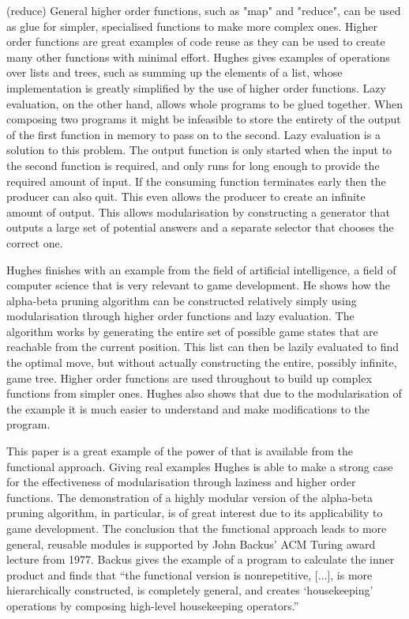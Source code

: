 \functions(reduce)
General higher order functions, such as "map" and "reduce", can be used as glue for
simpler, specialised functions to make more complex ones. Higher order functions
are great examples of code reuse as they can be used to create many other functions
with minimal effort. Hughes gives examples of operations over lists and trees, such
as summing up the elements of a list, whose implementation is greatly simplified
by the use of higher order functions. Lazy evaluation, on the other hand, allows
whole programs to be glued together. When composing two programs it might be
infeasible to store the entirety of the output of the first function in memory to
pass on to the second. Lazy evaluation is a solution to this problem. The output
function is only started when the input to the second function is required, and
only runs for long enough to provide the required amount of input. If the consuming
function terminates early then the producer can also quit. This even allows the
producer to create an infinite amount of output. This allows modularisation by
constructing a generator that outputs a large set of potential answers and a
separate selector that chooses the correct one.

Hughes finishes with an example from the field of artificial intelligence, a
field of computer science that is very relevant to game development. He shows
how the alpha-beta pruning algorithm can be constructed relatively simply using
modularisation through higher order functions and lazy evaluation. The algorithm
works by generating the entire set of possible game states that are reachable
from the current position. This list can then be lazily evaluated to find the
optimal move, but without actually constructing the entire, possibly infinite,
game tree. Higher order functions are used throughout to build up complex
functions from simpler ones. Hughes also shows that due to the modularisation
of the example it is much easier to understand and make modifications to the
program.

This paper is a great example of the power of that is available from the functional
approach. Giving real examples Hughes is able to make a strong case for the
effectiveness of modularisation through laziness and higher order functions.
The demonstration of a highly modular version of the alpha-beta pruning algorithm,
in particular, is of great interest due to its applicability to game development.
The conclusion that the functional approach leads to more general, reusable
modules is supported by John Backus' ACM Turing award lecture from 1977. Backus
gives the example of a program to calculate the inner product and finds that
``the functional version is nonrepetitive, [...], is more hierarchically constructed,
is completely general, and creates `housekeeping' operations by composing high-level
housekeeping operators.''\cite{backus1978liberate}

